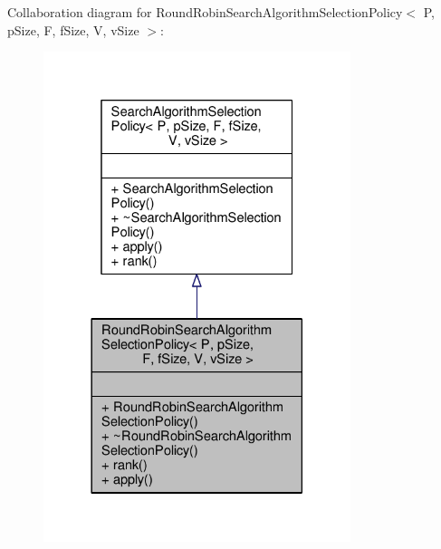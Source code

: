 Collaboration diagram for Round\+Robin\+Search\+Algorithm\+Selection\+Policy$<$ P, p\+Size, F, f\+Size, V, v\+Size $>$\+:\nopagebreak
\begin{figure}[H]
\begin{center}
\leavevmode
\includegraphics[width=254pt]{classRoundRobinSearchAlgorithmSelectionPolicy__coll__graph}
\end{center}
\end{figure}
